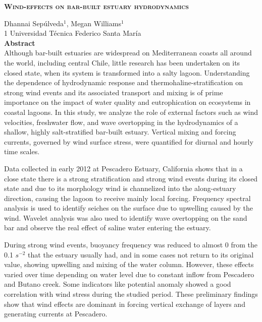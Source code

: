 \documentclass[11pt,letterpaper]{article}
\begin{document}
    \clearpage
    
    
    \newpage
    \begin{center}
        \textsc{\textbf{\Large Wind-effects on bar-built estuary hydrodynamics}}
    \end{center}
    Dhannai Sepúlveda$^1$, Megan Williams$^1$\\
    
    1 Universidad Técnica Federico Santa María\\
    
    \textbf{Abstract}\\
    Although bar-built estuaries are widespread on Mediterranean coasts all around the world, including central Chile, little research has been undertaken on its closed state, when its system is transformed into a salty lagoon. Understanding the dependence of hydrodynamic response and thermohaline-stratification on strong wind events and its associated transport and mixing is of prime importance on the impact of water quality and eutrophication on ecosystems in coastal lagoons. In this study, we analyze the role of external factors such as wind velocities, freshwater flow, and wave overtopping in the hydrodynamics of a shallow, highly salt-stratified bar-built estuary. Vertical mixing and forcing currents, governed by wind surface stress, were quantified for diurnal and hourly time scales.
    
    Data collected in early 2012 at Pescadero Estuary, California shows that in a close state there is a strong stratification and strong wind events during its closed state and due to its morphology wind is channelized into the along-estuary direction, causing the lagoon to receive mainly local forcing. Frequency spectral analysis is used to identify seiches on the surface due to upwelling caused by the wind. Wavelet analysis was also used to identify wave overtopping on the sand bar and observe the real effect of saline water entering the estuary. 
    
    During strong wind events, buoyancy frequency was reduced to almost 0 from the 0.1 $s^{-2}$ that the estuary usually had, and in some cases not return to its original value, showing upwelling and mixing of the water column. However, these effects varied over time depending on water level due to constant inflow from Pescadero and Butano creek. Some indicators like potential anomaly showed a good correlation with wind stress during the studied period. These preliminary findings show that wind effects are dominant in forcing vertical exchange of layers and generating currents at Pescadero.\\
    
\end{document}
